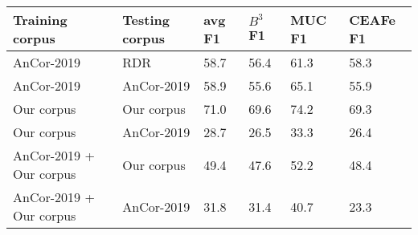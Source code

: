\begin{tabular}{|p{}|p{}|p{}|p{}|p{}|p{}|}
\hline
Training corpus &  Testing corpus &  avg F1 &  $B^3$ F1 & MUC F1 & CEAFe F1
\\ \hline
AnCor-2019 & RDR & 58.7 & 56.4 & 61.3 & 58.3 \\ \hline
AnCor-2019 & AnCor-2019 & 58.9 & 55.6 & 65.1 & 55.9 \\ \hline
Our corpus  & Our corpus  & 71.0 & 69.6 & 74.2 & 69.3 \\ \hline
Our corpus  & AnCor-2019 & 28.7 & 26.5 & 33.3 & 26.4 \\ \hline
AnCor-2019 + Our corpus  & Our corpus  & 49.4 & 47.6 & 52.2 & 48.4 \\ \hline
AnCor-2019 + Our corpus & AnCor-2019 & 31.8 & 31.4 & 40.7 & 23.3 \\ \hline
\end{tabular}